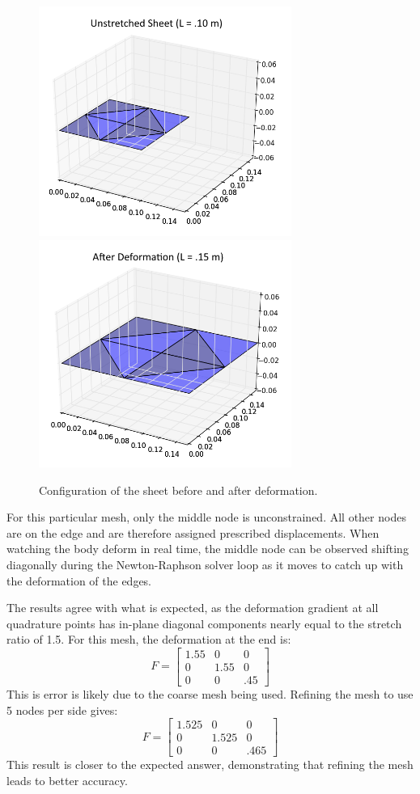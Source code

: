 \documentclass[]{spie}  %
\begin{document}
\begin{figure}[h]
	\centering
	\includegraphics[width=3.25in]{unstretched_sheet.png} \quad
	\includegraphics[width=3.25in]{stretched_sheet.png} 
	\caption{Configuration of the sheet before and after deformation.} 
	\label{fig: stretched sheet}
\end{figure}

For this particular mesh, only the middle node is unconstrained. All other nodes are on the edge and are therefore assigned prescribed displacements. When watching the body deform in real time, the middle node can be observed shifting diagonally during the Newton-Raphson solver loop as it moves to catch up with the deformation of the edges. 

The results agree with what is expected, as the deformation gradient at all quadrature points has in-plane diagonal components nearly equal to the stretch ratio of 1.5. For this mesh, the deformation at the end is:
\begin{equation}
F = 
\begin{bmatrix}
1.55 & 0 & 0 \\
0 & 1.55 & 0 \\
0 & 0 & .45
\end{bmatrix}
\end{equation}
This is error is likely due to the coarse mesh being used. Refining the mesh to use 5 nodes per side gives:
\begin{equation}
F = 
\begin{bmatrix}
1.525 & 0 & 0 \\
0 & 1.525 & 0 \\
0 & 0 & .465
\end{bmatrix}
\end{equation}
This result is closer to the expected answer, demonstrating that refining the mesh leads to better accuracy. 
\end{document}
